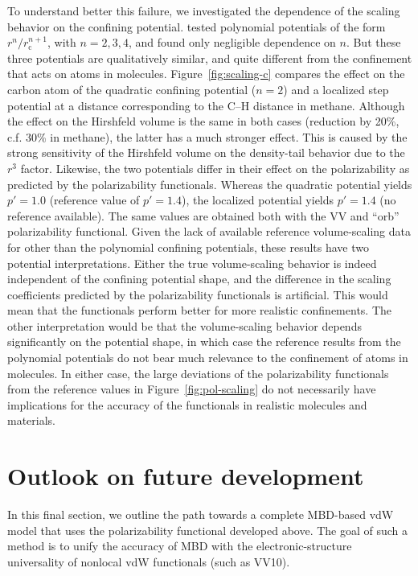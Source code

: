 To understand better this failure, we investigated the dependence of the scaling behavior on the confining potential.
\citeauthor{GouldJCP16} tested polynomial potentials of the form $r^n/r_\text{c}^{n+1}$, with $n=2,3,4$, and found only negligible dependence on $n$.
But these three potentials are qualitatively similar, and quite different from the confinement that acts on atoms in molecules.
Figure~\ref{fig:scaling-c} compares the effect on the carbon atom of the quadratic confining potential ($n=2$) and a localized step potential at a distance corresponding to the C--H distance in methane.
Although the effect on the Hirshfeld volume is the same in both cases (reduction by 20\%, c.f. 30\% in methane), the latter has a much stronger effect.
This is caused by the strong sensitivity of the Hirshfeld volume on the density-tail behavior due to the $r^3$ factor.
Likewise, the two potentials differ in their effect on the polarizability as predicted by the polarizability functionals.
Whereas the quadratic potential yields $p'=1.0$ (reference value of $p'=1.4$), the localized potential yields $p'=1.4$ (no reference available).
The same values are obtained both with the VV and ``orb'' polarizability functional.
Given the lack of available reference volume-scaling data for other than the polynomial confining potentials, these results have two potential interpretations.
Either the true volume-scaling behavior is indeed independent of the confining potential shape, and the difference in the scaling coefficients predicted by the polarizability functionals is artificial.
This would mean that the functionals perform better for more realistic confinements.
The other interpretation would be that the volume-scaling behavior depends significantly on the potential shape, in which case the reference results from the polynomial potentials do not bear much relevance to the confinement of atoms in molecules.
In either case, the large deviations of the polarizability functionals from the reference values in Figure~\ref{fig:pol-scaling} do not necessarily have implications for the accuracy of the functionals in realistic molecules and materials.

\section{Outlook on future development}

In this final section, we outline the path towards a complete MBD-based vdW model that uses the polarizability functional developed above.
The goal of such a method is to unify the accuracy of MBD with the electronic-structure universality of nonlocal vdW functionals (such as VV10).

